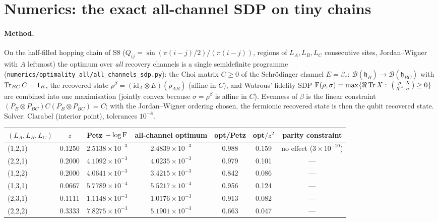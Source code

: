 \documentclass[11pt,a4paper]{article}
\newcommand{\hh}{\mathfrak h}\newcommand{\Var}{\operatorname{Var}}
\begin{document}

\section{Numerics: the exact all-channel SDP on tiny chains}\label{sec:num}

\paragraph{Method.}  On the half-filled hopping chain of S8 (\(Q_{ij}=\sin(\pi(i-j)/2)/(\pi(i-j))\),
regions of \(L_A,L_B,L_C\) consecutive sites, Jordan--Wigner with \(A\) leftmost) the optimum over
\emph{all} recovery channels is a single semidefinite programme
(\texttt{numerics/optimality\_all/all\_channels\_sdp.py}): the Choi matrix \(C\ge0\) of the
Schr\"odinger channel \(E=\beta_*:\ \mathcal B(\hh_B)\to\mathcal B(\hh_{BC})\) with
\(\operatorname{Tr}_{BC}C=1_B\), the recovered state \(\rho^\beta=(\mathrm{id}_A\otimes E)(\rho_{AB})\) (affine in
\(C\)), and Watrous' fidelity SDP \(\Fid(\rho,\sigma)=\max\{\Re\Tr X:\ \bigl(\begin{smallmatrix}\rho&X\\X^*&\sigma\end{smallmatrix}\bigr)\ge0\}\)
are combined into one maximisation (jointly convex because \(\sigma=\rho^\beta\) is affine in \(C\)).
Evenness of \(\beta\) is the linear constraint \((P_B\otimes P_{BC})C(P_B\otimes P_{BC})=C\); with the
Jordan--Wigner ordering chosen, the fermionic recovered state is then the qubit recovered state.
Solver: Clarabel (interior point), tolerances \(10^{-8}\).

\begin{center}\small
\begin{tabular}{lcccccc}
\toprule
\((L_A,L_B,L_C)\) & \(z\) & Petz \(-\log\operatorname{F}\) & all-channel optimum & opt/Petz & opt\(/z^2\) & parity constraint \\
\midrule
(1,2,1) & 0.1250 & \(2.5138\times10^{-3}\) & \(2.4839\times10^{-3}\) & 0.988 & 0.159 & no effect (\(3\times10^{-10}\)) \\
(2,2,1) & 0.2000 & \(4.1092\times10^{-3}\) & \(4.0235\times10^{-3}\) & 0.979 & 0.101 & --- \\
(1,2,2) & 0.2000 & \(4.0641\times10^{-3}\) & \(3.4215\times10^{-3}\) & 0.842 & 0.086 & --- \\
(1,3,1) & 0.0667 & \(5.7789\times10^{-4}\) & \(5.5217\times10^{-4}\) & 0.956 & 0.124 & --- \\
(2,3,1) & 0.1111 & \(1.1148\times10^{-3}\) & \(1.0176\times10^{-3}\) & 0.913 & 0.082 & --- \\
(2,2,2) & 0.3333 & \(7.8275\times10^{-3}\) & \(5.1901\times10^{-3}\) & 0.663 & 0.047 & --- \\
\bottomrule
\end{tabular}
\end{center}
\end{document}
